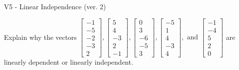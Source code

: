 \begin{exercise}
  \begin{exerciseTitle}V5 - Linear Independence (ver. 2)\end{exerciseTitle}
  \begin{exerciseStatement}
    Explain why the vectors \(\left[\begin{array}{r}
-1 \\
-5 \\
-2 \\
-3 \\
2
\end{array}\right] , \left[\begin{array}{r}
5 \\
4 \\
-3 \\
2 \\
-1
\end{array}\right] , \left[\begin{array}{r}
0 \\
3 \\
-6 \\
-5 \\
3
\end{array}\right] , \left[\begin{array}{r}
-5 \\
1 \\
4 \\
-3 \\
4
\end{array}\right] , \text{ and } \left[\begin{array}{r}
-1 \\
-4 \\
5 \\
2 \\
0
\end{array}\right]\) are linearly dependent or linearly independent.	



\end{exerciseStatement}
\end{exercise}
